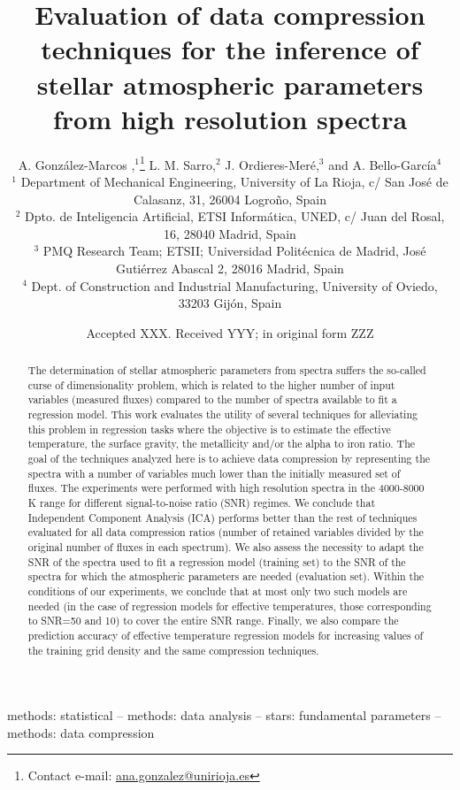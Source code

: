 \documentclass[a4paper,fleqn,usenatbib]{mnras}
\title[]{Evaluation of data compression techniques for the inference of
  stellar atmospheric parameters from high resolution spectra}
\author[A. Gonz\'alez-Marcos et al.]{
A. Gonz\'alez-Marcos ,$^{1}$\thanks{Contact e-mail: \href{mailto:}{ana.gonzalez@unirioja.es}}
L. M. Sarro,$^{2}$
J. Ordieres-Mer\'e,$^{3}$
and A. Bello-Garc\'ia$^{4}$
\\
$^{1}$ Department of Mechanical Engineering, University of La Rioja, c/ San Jos\'e de Calasanz, 31, 26004 Logro\~no, Spain  \\
$^{2}$ Dpto. de Inteligencia Artificial, ETSI Inform\'atica, UNED, c/ Juan del Rosal, 16, 28040 Madrid, Spain \\
$^{3}$ PMQ Research Team; ETSII; Universidad Polit\'ecnica de Madrid, Jos\'e Guti\'errez Abascal 2, 28016 Madrid, Spain\\
$^{4}$ Dept. of Construction and Industrial Manufacturing, University of Oviedo, 33203 Gij\'on, Spain\\
}
\date{Accepted XXX. Received YYY; in original form ZZZ}
\begin{document}
\label{firstpage}
\pagerange{\pageref{firstpage}--\pageref{lastpage}}
\maketitle

\begin{abstract}
The determination of stellar atmospheric parameters from spectra
suffers the so-called curse of dimensionality problem, which is
related to the higher number of input variables (measured fluxes)
compared to the number of spectra available to fit a regression model.
This work evaluates the utility of several techniques for
alleviating this problem in regression tasks where the objective is to
estimate the effective temperature, the surface gravity, the
metallicity and/or the alpha to iron ratio. The goal of the
techniques analyzed here is to achieve data compression by representing the spectra
with a number of variables much lower than the initially measured
set of fluxes. The experiments were performed with high resolution
spectra in the 4000-8000 K range for different signal-to-noise ratio
(SNR) regimes. We conclude that Independent Component Analysis (ICA)
performs better than the rest of techniques evaluated for all data
compression ratios (number of retained variables divided by the 
original number of fluxes in each spectrum). We also assess the
necessity to adapt the SNR of the spectra used to fit a regression
model (training set) to the SNR of the spectra for which the
atmospheric parameters are needed (evaluation set). Within the
conditions of our experiments, we conclude that at most only two such
models are needed (in the case of regression models for effective
temperatures, those corresponding to SNR=50 and 10) to cover the
entire SNR range. Finally, we also compare the prediction accuracy of
effective temperature regression models for increasing values of the
training grid density and the same compression techniques.

\end{abstract}

\begin{keywords}
methods: statistical -- methods: data analysis -- stars: fundamental parameters -- methods: data compression
\end{keywords}

\end{document}
